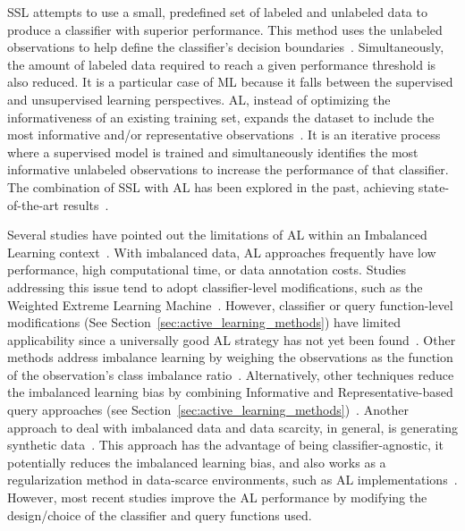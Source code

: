\documentclass[parskip=full]{scrartcl}
\begin{document}
SSL attempts to use a small, predefined set of labeled and unlabeled data to
produce a classifier with superior performance. This method uses the unlabeled
observations to help define the classifier's decision
boundaries~\cite{Van2020}. Simultaneously, the amount of labeled data required
to reach a given performance threshold is also reduced. It is a particular
case of ML because it falls between the supervised and unsupervised learning
perspectives. AL, instead of optimizing the informativeness of an existing
training set, expands the dataset to include the most informative and/or
representative observations~\cite{Sener2018}. It is an iterative process where
a supervised model is trained and simultaneously identifies the most
informative unlabeled observations to increase the performance of that
classifier. The combination of SSL with AL has been explored in the past,
achieving state-of-the-art results~\cite{Leng2013}.
 
Several studies have pointed out the limitations of AL within an Imbalanced
Learning context~\cite{Yu2019, zhang2020reinforcement}. With imbalanced data,
AL approaches frequently have low performance, high computational time, or
data annotation costs.  Studies addressing this issue tend to adopt
classifier-level modifications, such as the Weighted Extreme Learning
Machine~\cite{Yu2019, Zong2013, Qin2021}. However, classifier or query
function-level modifications (See Section~\ref{sec:active_learning_methods})
have limited applicability since a universally good AL strategy has not yet
been found~\cite{Sener2018}. Other methods address imbalance learning by
weighing the observations as the function of the observation's class imbalance
ratio~\cite{Liu2021}.  Alternatively, other techniques reduce the imbalanced
learning bias by combining Informative and Representative-based query
approaches (see Section~\ref{sec:active_learning_methods})~\cite{Tharwat2020}.
Another approach to deal with imbalanced data and data scarcity, in general,
is generating synthetic data~\cite{he2009learning}. This approach has the
advantage of being classifier-agnostic, it potentially reduces the imbalanced
learning bias, and also works as a regularization method in data-scarce
environments, such as AL implementations~\cite{Kim2021}. However, most recent
studies improve the AL performance by modifying the design/choice of the
classifier and query functions used.
 
\end{document}
